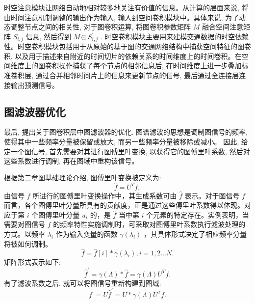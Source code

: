 时空注意模块让网络自动地相对较多地关注有价值的信息。从计算的层面来说, 将由时间注意机制调整的输出作为输入, 输入到空间卷积模块中。具体来说, 为了动态调整节点之间的相关性, 对于图卷积运算, 将图卷积参数矩阵 \({M}\) 融合空间注意矩阵 \({S}_{i, j}\) 信息, 然后得到 \({M} \odot  {S}_{i, j}^{\prime }\) . 时空卷积模块主要用来建模交通数据的时空依赖性。时空卷积模块包括用于从原始的基于图的交通网络结构中捕获空间特征的图卷积, 以及用于描述来自附近的时间切片的依赖关系的时间维度上的时间卷积。在空间维度上的图卷积操作捕获了每个节点的相邻信息后, 在时间维度上进一步叠加标准卷积层, 通过合并相邻时间片上的信息来更新节点的信号, 最后通过全连接层连接输出预测信号。


\subsection{图滤波器优化}


最后, 提出关于图卷积层中图滤波器的优化. 图谱滤波的思想是调制图信号的频率, 使得其中一些频率分量被保留或放大, 而另一些频率分量被移除或减小。 因此, 给定一个图信号, 首先需要对其进行图傅里叶变换, 以获得它的图傅里叶系数, 然后对这些系数进行调制, 再在图域中重构该信号。

根据第二章图基础理论介绍, 图傅里叶变换被定义为:
\begin{equation}
\widehat{f} = {U}^{T}f, 
\end{equation}
由信号 \(f\) 所进行的图傅里叶变换操作中，其生成系数可由 \(\widehat{f}\) 表示。对于图信号 \(f\) 而言，各个图傅里叶分量所具有的贡献度，正是通过这些傅里叶系数得以体现。对应于第 \({i}\) 个图傅里叶分量 \({u}_{i}\) 的，是 \(\widehat{f}\) 当中第 \({i}\) 个元素的特定存在。实例表明，当需要对图信号 \(f\) 的频率特性实施调制时，可采取对图傅里叶系数执行滤波处理的方式。以频率 \({\lambda }_{i}\) 作为输入变量的函数 \(\gamma \left( {\lambda }_{i}\right)\) ，其具体形式决定了相应频率分量将被如何调制。
\begin{equation}
\widehat{f} = \widehat{f}\left\lbrack  i\right\rbrack   * \gamma \left( {\lambda }_{i}\right) , i = 1, 2\ldots N.
\end{equation}
矩阵形式表示如下:
\begin{equation}
{\widehat{f}}^{\prime } = \gamma \left( \Lambda \right)  * \widehat{f} = \gamma \left( \Lambda \right) {U}^{T}f.
\end{equation}
有了滤波系数之后, 就可以将图信号重新构建到图域:
\begin{equation}
{f}^{\prime } = U{\widehat{f}}^{\prime } = U * \gamma \left( \Lambda \right) {U}^{T}f.
\end{equation}


